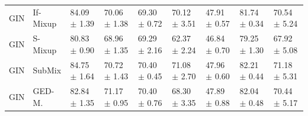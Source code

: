\begin{table}
\begin{tabular}{lllllllll}
GIN & If-Mixup & 84.09 $\pm$ 1.39 & 70.06 $\pm$ 1.38 & 69.30 $\pm$ 0.72 & 70.12 $\pm$ 3.51 & 47.91 $\pm$ 0.57 & 81.74 $\pm$ 0.34 & 70.54 $\pm$ 5.24\\
GIN & S-Mixup & 80.83 $\pm$ 0.90 & 68.96 $\pm$ 1.35 & 69.29 $\pm$ 2.16 & 62.37 $\pm$ 2.24 & 46.84 $\pm$ 0.70 & 79.25 $\pm$ 1.30 & 67.92 $\pm$ 5.08\\
GIN & SubMix & 84.75 $\pm$ 1.64 & 70.72 $\pm$ 1.43 & 70.40 $\pm$ 0.45 & 71.08 $\pm$ 2.70 & 47.96 $\pm$ 0.60 & 82.21 $\pm$ 0.44 & 71.18 $\pm$ 5.31\\
GIN & GED-M. & 82.84 $\pm$ 1.35 & 71.17 $\pm$ 0.95 & 70.40 $\pm$ 0.76 & 68.30 $\pm$ 3.35 & 47.89 $\pm$ 0.88 & 82.04 $\pm$ 0.48 & 70.44 $\pm$ 5.17\\
\bottomrule
\end{tabular}
\end{table}
